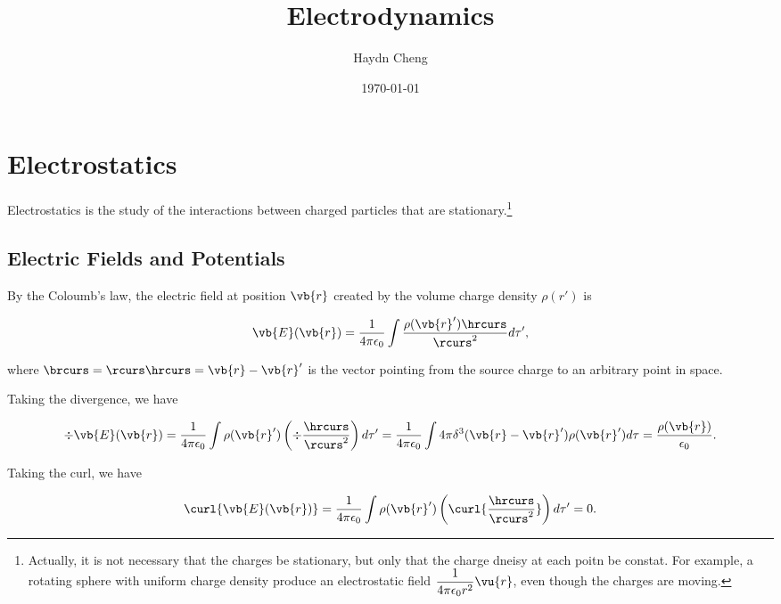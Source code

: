 \documentclass[english,a4paper,12pt]{report}
\title{Electrodynamics}
\author{Haydn Cheng}
\date{\today}
\begin{document}
\maketitle
\tableofcontents
    
\chapter{Electrostatics}

Electrostatics is the study of the interactions between charged particles that are stationary.\footnote{Actually, it is not necessary that the charges be stationary, but only that the charge dneisy at each poitn be constat. For example, a rotating sphere with uniform charge density produce an electrostatic field \(\displaystyle \frac{1}{4\pi \epsilon_0 r^2}\vu{r}  \), even though the charges are moving.} 

\section{Electric Fields and Potentials}


By the Coloumb's law, the electric field at position \(\vb{r} \) created by the volume charge density \(\rho (r')\) is

\begin{equation}
    \vb{E}(  \vb{r}) = \frac{1}{4\pi \epsilon_0} \int \frac{\rho ( \vb{r}' ) \hrcurs}{\rcurs ^2}   d\tau ', \label{comb} 
\end{equation}

where \(\brcurs = \rcurs \hrcurs = \vb{r} -\vb{r} '\) is the vector pointing from the source charge to an arbitrary point in space.

Taking the divergence, we have 

\begin{equation}
    \div{\vb{E}(\vb{r} )} = \frac{1}{4\pi\epsilon_0} \int \rho (\vb{r} ') \left(\div{\frac{\hrcurs }{\rcurs ^2} }\right) d\tau ' = \frac{1}{4\pi \epsilon_0} \int 4\pi \delta ^3 (\vb{r} - \vb{r} ')\rho (\vb{r} ') d\tau = \frac{\rho (\vb{r} )}{\epsilon _0}.  	 
\end{equation}

Taking the curl, we have 

\begin{equation}
    \curl{\vb{E}(\vb{r} ) } = \frac{1}{4\pi \epsilon_0} \int \rho(\vb{r} ') \left( \curl{ \frac{\hrcurs }{\rcurs ^2}  }\right)  d\tau'  = 0.
\end{equation}
\end{document}
